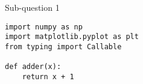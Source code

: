 \documentclass[11pt]{article}
\begin{document}

\maketitle %

\thispagestyle{empty} %


\begin{question}



\begin{subquestion}{Sub-question 1} %
\answer{
	
}
\end{subquestion}
\end{question}

\begin{question}


\begin{verbatim}
import numpy as np
import matplotlib.pyplot as plt
from typing import Callable

def adder(x):
	return x + 1

\end{verbatim}
\end{question}
\end{document}
